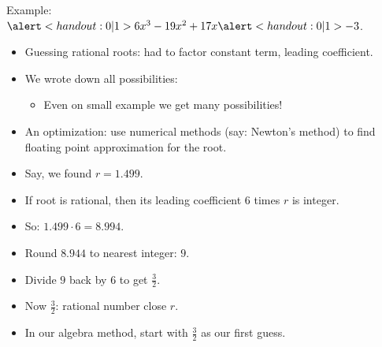 \begin{frame}
Example: $\alertNoH{1}{6}x^3-19x^2+17x\alertNoH{1}{-3}$.
\begin{itemize}
\item Guessing rational roots: had to factor constant term, leading coefficient.
\item<2-> We wrote down all possibilities:
\begin{itemize}
\item<3-> Even on small example we get many possibilities!
\end{itemize}
\item<4-> An optimization: use numerical methods (say: Newton's method) to find floating point approximation for the root.
\item<5-> Say, we found $r=1.499$.
\item<6-> If root is rational, then its leading coefficient $6$ times $r$ is integer.
\item<7-> So: $1.499\cdot 6=8.994$. 

\item<8-> Round $8.944$ to nearest integer: $9$. 
\item<9-> Divide $9$ back by $6$ to get $\frac{3}{2}$. 
\item<10-> Now $\frac{3}{2}$: rational number close $r$.
\item<11-> In our algebra method, start with $\frac{3}{2}$ as our first guess. 
\end{itemize}
\end{frame}